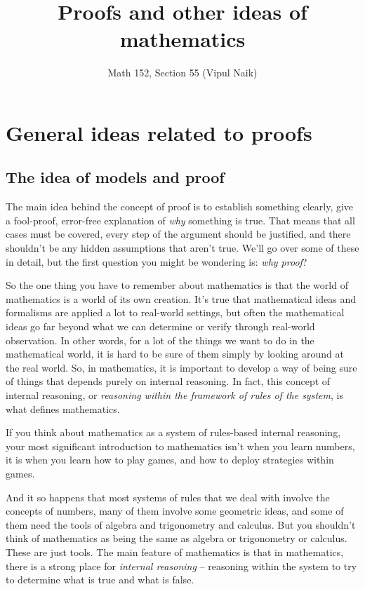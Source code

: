 \documentclass{amsart}
\title{Proofs and other ideas of mathematics}
\author{Math 152, Section 55 (Vipul Naik)}
\begin{document}
\maketitle

\section{General ideas related to proofs}

\subsection{The idea of models and proof}

The main idea behind the concept of proof is to establish something
clearly, give a fool-proof, error-free explanation of {\em why}
something is true. That means that all cases must be covered, every
step of the argument should be justified, and there shouldn't be any
hidden assumptions that aren't true. We'll go over some of these in
detail, but the first question you might be wondering is: {\em why
proof}?

So the one thing you have to remember about mathematics is that the
world of mathematics is a world of its own creation. It's true that
mathematical ideas and formalisms are applied a lot to real-world
settings, but often the mathematical ideas go far beyond what we can
determine or verify through real-world observation. In other words,
for a lot of the things we want to do in the mathematical world, it is
hard to be sure of them simply by looking around at the real
world. So, in mathematics, it is important to develop a way of being
sure of things that depends purely on internal reasoning. In fact,
this concept of internal reasoning, or {\em reasoning within the
framework of rules of the system}, is what defines mathematics.

If you think about mathematics as a system of rules-based internal
reasoning, your most significant introduction to mathematics isn't
when you learn numbers, it is when you learn how to play games, and
how to deploy strategies within games.

And it so happens that most systems of rules that we deal with involve
the concepts of numbers, many of them involve some geometric ideas,
and some of them need the tools of algebra and trigonometry and
calculus. But you shouldn't think of mathematics as being the same as
algebra or trigonometry or calculus. These are just tools. The main
feature of mathematics is that in mathematics, there is a strong place
for {\em internal reasoning} -- reasoning within the system to try to
determine what is true and what is false.
\end{document}
